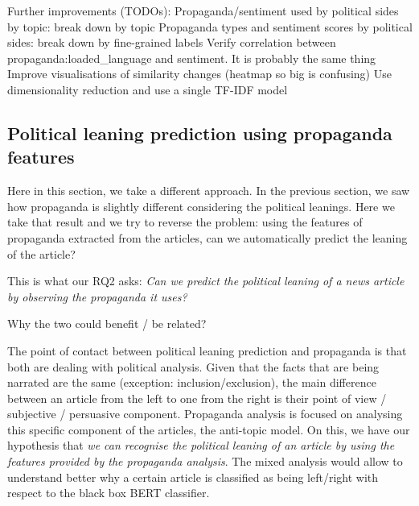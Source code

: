 Further improvements (TODOs):
Propaganda/sentiment used by political sides by topic: break down by topic
Propaganda types and sentiment scores by political sides: break down by fine-grained labels
Verify correlation between propaganda:loaded\_language and sentiment. It is probably the same thing
Improve visualisations of similarity changes (heatmap so big is confusing)
Use dimensionality reduction and use a single TF-IDF model








\subsection{\statusorange Political leaning prediction using propaganda features}
\label{ssec:ps_prop_leaning_classifier}

Here in this section, we take a different approach.
In the previous section, we saw how propaganda is slightly different considering the political leanings.
Here we take that result and we try to reverse the problem: using the features of propaganda extracted from the articles, can we automatically predict the leaning of the article?

This is what our RQ2 asks: \emph{Can we predict the political leaning of a news article by observing the propaganda it uses?}

Why the two could benefit / be related?

The point of contact between political leaning prediction and propaganda is that both are dealing with political analysis.
Given that the facts that are being narrated are the same (exception: inclusion/exclusion), the main difference between an article from the left to one from the right is their point of view / subjective / persuasive component. Propaganda analysis is focused on analysing this specific component of the articles, the anti-topic model.
On this, we have our hypothesis that \emph{we can recognise the political leaning of an article by using the features provided by the propaganda analysis}.
The mixed analysis would allow to understand better why a certain article is classified as being left/right with respect to the black box BERT classifier.

